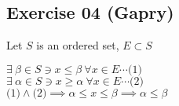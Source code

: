 \subsection*{Exercise 04 (Gapry)}
Let $S$ is an ordered set, $E \subset S$ 
\begin{flushleft}
$\exists\ \beta \in S \ni x \leq \beta \ \forall x \in E \cdots \text{(1)}$   \\
$\exists\ \alpha \in S \ni x \geq \alpha \ \forall x \in E \cdots \text{(2)}$ \\
$\text{(1)} \land \text{(2)} \implies \alpha \leq x \leq \beta \implies \alpha \leq \beta$
\end{flushleft}
